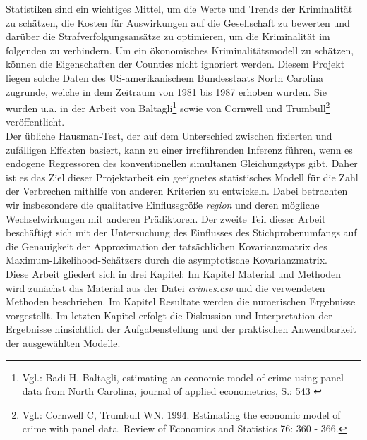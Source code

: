 Statistiken sind ein wichtiges Mittel, um die Werte und Trends der Kriminalit\"at zu sch\"atzen, die Kosten f\"ur Auswirkungen auf die Gesellschaft zu bewerten und dar\"uber die Strafverfolgungsans\"atze zu optimieren, um die Kriminalit\"at im folgenden zu verhindern. 
Um ein \"okonomisches Kriminalit\"atsmodell zu sch\"atzen, k\"onnen die Eigenschaften der Counties nicht ignoriert werden. Diesem Projekt liegen solche Daten des US-amerikanischem Bundesstaats North Carolina zugrunde, welche in dem Zeitraum von 1981 bis 1987 erhoben wurden. Sie wurden u.a. in der Arbeit von Baltagli\footnote{Vgl.: Badi H. Baltagli, estimating an economic model of crime using panel data from North Carolina, journal of applied econometrics, S.: 543 \label{ftn:bal}} sowie von Cornwell und Trumbull\footnote{Vgl.: Cornwell C, Trumbull WN. 1994. Estimating the economic model of crime with panel data. Review of
Economics and Statistics 76: 360 - 366.} ver\"offentlicht. \\
 
Der \"ubliche Hausman-Test, der auf dem Unterschied zwischen fixierten und zuf\"alligen Effekten basiert, kann zu einer irref\"uhrenden Inferenz f\"uhren, wenn es endogene Regressoren des konventionellen simultanen Gleichungstyps gibt.
Daher ist es das Ziel dieser Projektarbeit ein geeignetes statistisches Modell f\"ur die Zahl der Verbrechen mithilfe von anderen Kriterien zu entwickeln. Dabei betrachten wir insbesondere die qualitative Einflussgr\"o\ss{}e \textit{region} und deren m\"ogliche Wechselwirkungen mit anderen Pr\"adiktoren. 
Der zweite Teil dieser Arbeit besch\"aftigt sich mit der Untersuchung des Einflusses des Stichprobenumfangs auf die Genauigkeit der Approximation der tats\"achlichen Kovarianzmatrix des Maximum-Likelihood-Sch\"atzers durch die asymptotische Kovarianzmatrix. \\

Diese Arbeit gliedert sich in drei Kapitel: Im Kapitel Material und Methoden wird zun\"achst das Material aus der Datei \textit{crimes.csv} und die verwendeten Methoden beschrieben. Im Kapitel Resultate werden die numerischen Ergebnisse vorgestellt. Im letzten Kapitel erfolgt die Diskussion und Interpretation der Ergebnisse hinsichtlich der Aufgabenstellung und der praktischen Anwendbarkeit der ausgew\"ahlten Modelle.